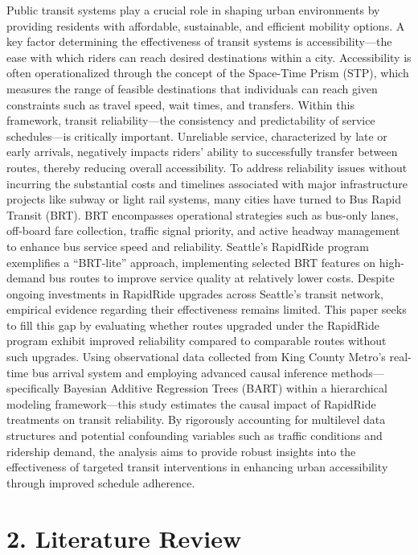 \documentclass[
  12pt,
]{article}
\begin{document}
Public transit systems play a crucial role in shaping urban environments
by providing residents with affordable, sustainable, and efficient
mobility options. A key factor determining the effectiveness of transit
systems is accessibility---the ease with which riders can reach desired
destinations within a city. Accessibility is often operationalized
through the concept of the Space-Time Prism (STP), which measures the
range of feasible destinations that individuals can reach given
constraints such as travel speed, wait times, and transfers. Within this
framework, transit reliability---the consistency and predictability of
service schedules---is critically important. Unreliable service,
characterized by late or early arrivals, negatively impacts riders'
ability to successfully transfer between routes, thereby reducing
overall accessibility. To address reliability issues without incurring
the substantial costs and timelines associated with major infrastructure
projects like subway or light rail systems, many cities have turned to
Bus Rapid Transit (BRT). BRT encompasses operational strategies such as
bus-only lanes, off-board fare collection, traffic signal priority, and
active headway management to enhance bus service speed and reliability.
Seattle's RapidRide program exemplifies a ``BRT-lite'' approach,
implementing selected BRT features on high-demand bus routes to improve
service quality at relatively lower costs. Despite ongoing investments
in RapidRide upgrades across Seattle's transit network, empirical
evidence regarding their effectiveness remains limited. This paper seeks
to fill this gap by evaluating whether routes upgraded under the
RapidRide program exhibit improved reliability compared to comparable
routes without such upgrades. Using observational data collected from
King County Metro's real-time bus arrival system and employing advanced
causal inference methods---specifically Bayesian Additive Regression
Trees (BART) within a hierarchical modeling framework---this study
estimates the causal impact of RapidRide treatments on transit
reliability. By rigorously accounting for multilevel data structures and
potential confounding variables such as traffic conditions and ridership
demand, the analysis aims to provide robust insights into the
effectiveness of targeted transit interventions in enhancing urban
accessibility through improved schedule adherence.

\section{2. Literature Review}\label{literature-review}
\end{document}
